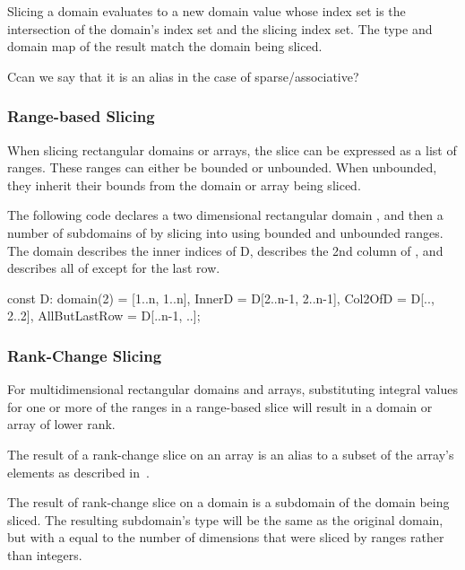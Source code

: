 Slicing a domain evaluates to a new domain value whose index set is
the intersection of the domain's index set and the slicing index set.
The type and domain map of the result match the domain being sliced.

\begin{openissue}
Ccan we say that it is an alias in the case of sparse/associative?
\end{openissue}

\subsubsection{Range-based Slicing}
\label{Range_Based_Slicing}
When slicing rectangular domains or arrays, the slice can be expressed
as a list of  ranges.  These ranges can either be bounded
or unbounded.  When unbounded, they inherit their bounds from the
domain or array being sliced.

\begin{example}
The following code declares a two dimensional rectangular
domain , and then a number of subdomains of  by
slicing into  using bounded and unbounded ranges.
The  domain describes the inner indices of
D,  describes the 2nd column of
, and  describes all of  except
for the last row.

\begin{chapel}
const D: domain(2) = [1..n, 1..n],
      InnerD = D[2..n-1, 2..n-1],
      Col2OfD = D[.., 2..2],
      AllButLastRow = D[..n-1, ..];
\end{chapel}
\end{example}

\subsubsection{Rank-Change Slicing}
\label{Rank_Change_Slicing}

For multidimensional rectangular domains and arrays, substituting
integral values for one or more of the ranges in a range-based slice
will result in a domain or array of lower rank.

The result of a rank-change slice on an array is an alias to a subset
of the array's elements as described
in~.

The result of rank-change slice on a domain is a subdomain of the
domain being sliced.  The resulting
subdomain's type will be the same as the original domain, but with
a  equal to the number of dimensions that were sliced by
ranges rather than integers.


